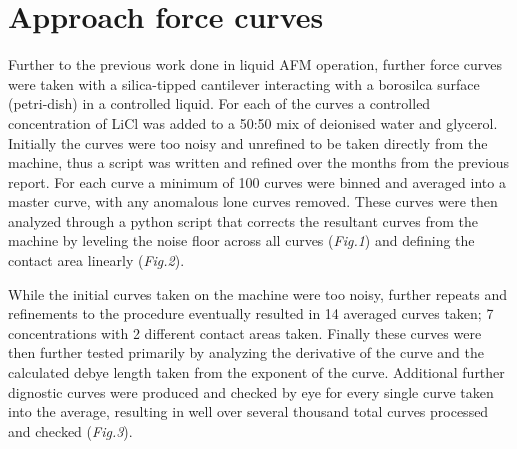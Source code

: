 



\chapter{Approach force curves}

Further to the previous work done in liquid AFM operation, further force curves were taken with a silica-tipped cantilever interacting with a borosilca surface (petri-dish) in a controlled liquid. For each of the curves a controlled concentration of LiCl was added to a 50:50 mix of deionised water and glycerol. Initially the curves were too noisy and unrefined to be taken directly from the machine, thus a script was written and refined over the months from the previous report. For each curve a minimum of 100 curves were binned and averaged into a master curve, with any anomalous lone curves removed. These curves were then analyzed through a python script that corrects the resultant curves from the machine by leveling the noise floor across all curves (\textit{Fig.1}) and defining the contact area linearly (\textit{Fig.2}). 


\newpage

While the initial curves taken on the machine were too noisy, further repeats and refinements to the procedure eventually resulted in 14 averaged curves taken; 7 concentrations with 2 different contact areas taken. Finally these curves were then further tested primarily by analyzing the derivative of the curve and the calculated debye length taken from the exponent of the curve. Additional further dignostic curves were produced and checked by eye for every single curve taken into the average, resulting in well over several thousand total curves processed and checked (\textit{Fig.3}).


